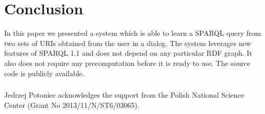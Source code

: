 \documentclass{llncs}
\begin{document}
\section{Conclusion}

In this paper we presented a system which is able to learn a SPARQL query from two sets of URIs obtained from the user in a dialog.
The system leverages new features of SPARQL 1.1 and does not depend on any particular RDF graph.
It also does not require any precomputation before it is ready to use.
The source code is publicly available.

\subsubsection*{\ackname}
Jedrzej Potoniec acknowledges the support from the Polish National Science Center (Grant No 2013/11/N/ST6/03065).




\end{document}
